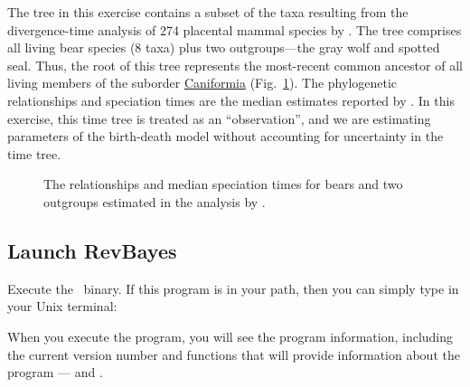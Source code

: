 The tree in this exercise contains a subset of the taxa resulting from the divergence-time analysis of 274 placental mammal species by \citet{dosReis2012}. 
The tree comprises all living bear species (8 taxa) plus two outgroups---the gray wolf and spotted seal.
Thus, the root of this tree represents the most-recent common ancestor of all living members of the suborder \href{http://en.wikipedia.org/wiki/Caniformia}{Caniformia} (Fig.~\ref{bearTree}). 
The phylogenetic relationships and speciation times are the median estimates reported by \citet{dosReis2012}. 
In this exercise, this time tree is treated as an ``observation'', and we are estimating parameters of the birth-death model without accounting for uncertainty in the time tree.


\begin{figure}[h!]
\centering
{}
\caption{\small The relationships and median speciation times for bears and two outgroups estimated in the analysis by \citet{dosReis2012}.}
\label{bearTree}
\end{figure}

\bigskip
\subsection{Launch RevBayes}

Execute the \RevBayes~binary. If this program is in your path, then you can simply type in your Unix terminal:
\colorbox{shadecolor}{}

When you execute the program, you will see the program information, including the current version number and functions that will provide information about the program ---  and . %
%

